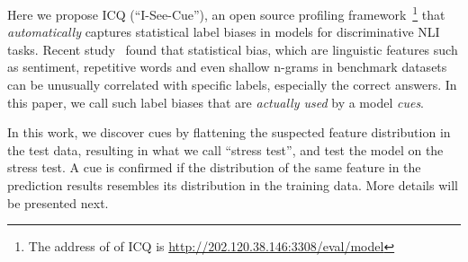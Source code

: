 Here we propose ICQ (``I-See-Cue''), 
an open source profiling framework~\footnote{The address of of ICQ is 
\url{http://202.120.38.146:3308/eval/model}} that
{\em automatically} captures statistical label biases in
models for discriminative NLI tasks. %
Recent study~\cite{gururangan2018annotation,sanchez2018behavior,poliak2018hypothesis} 
found that 
statistical bias, which are linguistic features such as 
sentiment, repetitive words and even shallow n-grams in 
benchmark datasets can be unusually correlated with specific
labels, especially the correct answers. 
In this paper, we call such label biases that are {\em actually used} by 
a model {\em cues}.  

In this work, we discover cues by flattening the suspected feature distribution 
in the test data, resulting in what we call ``stress test'',
and test the model on the stress test. A cue is confirmed if 
the distribution of the same feature in the prediction results
resembles its distribution in the training data. More details
will be presented next.

%

